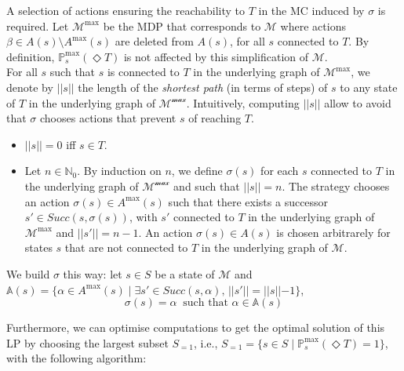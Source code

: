 A selection of actions ensuring
the reachability to $T$ in the
MC induced by $\sigma$ is required.
Let $\mathcal{M}^{\max}$ be the MDP that corresponds to $\mathcal{M}$
where actions $\beta \in A(s) \setminus A^{\max}(s)$ are deleted from $A(s)$,
for all $s$ connected to $T$.
By definition, $\mathbb{P}^{\max}_s(\Diamond T)$ is not affected by this simplification of
$\mathcal{M}$. \\

For all $s$ such that $s$ is connected to $T$ in the underlying graph of
$\mathcal{M}^{\max}$, we denote by $||s||$ the length of the \textit{shortest path} (in terms of steps) of $s$ to any state of $T$ in the underlying graph of
$\mathcal{M^{\max}}$. Intuitively, computing $||s||$ allow to avoid that $\sigma$ chooses
actions that prevent $s$ of reaching $T$.
\begin{itemize}
	\renewcommand{\labelitemi}{\tiny$\bullet$}
	\item $||s|| = 0$ iff $s \in T$.
	\item Let $n \in \mathbb{N}_0$. By induction on $n$, we define
		$\sigma(s)$ for each $s$ connected to $T$ in the underlying graph of
		$\mathcal{M^{\max}}$ and such that $||s|| = n$.
		The strategy chooses an action $\sigma(s) \in A^{\max}(s)$ such that there exists a successor $s' \in Succ(s, \sigma(s))$, with $s'$ connected to $T$ in the underlying graph of
		$\mathcal{M}^{\max}$ and $||s'|| = n - 1$. An action $\sigma(s) \in A(s)$ is chosen
		arbitrarely for states $s$ that are not connected to $T$ in the underlying graph of $\mathcal{M}$.
\end{itemize}
We build $\sigma$ this way: let $s \in S$ be a state of $\mathcal{M}$ and $\mathbb{A}(s) = \{\alpha \in A^{\max}(s) \; | \; \exists s' \in Succ(s,
	\alpha), \, ||s'|| = ||s|| - 1 \}$,
\[
	\sigma(s) = \alpha \;\; \text{such that } \alpha \in \mathbb{A}(s)
\]

Furthermore, we can optimise computations to get the optimal solution of this LP by choosing the largest subset $S_{=1}$, i.e., $S_{=1}=\{s\in S \; | \; \mathbb{P}^{\max}_s(\Diamond T) = 1\}$, with the following algorithm:

